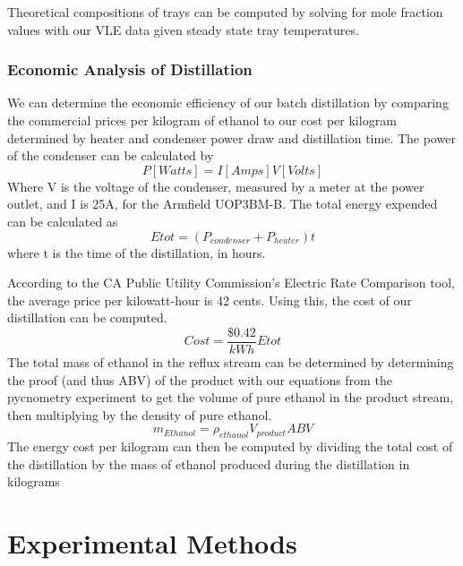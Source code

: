 \documentclass[lettersize,journal]{IEEEtran}
\begin{document}
	Theoretical compositions of trays can be computed by solving for mole fraction values with our VLE data given steady state tray temperatures.
	\subsubsection{Economic Analysis of Distillation}
	We can determine the economic efficiency of our batch distillation by comparing the commercial prices per kilogram of ethanol to our cost per kilogram determined by heater and condenser power draw and distillation time.
	The power of the condenser can be calculated by
	\begin{equation}
		\label{deqn_ex5.5}
		P [Watts] = I[Amps]V[Volts]
	\end{equation}
	Where V is the voltage of the condenser, measured by a meter at the power outlet, and I is 25A, for the Armfield UOP3BM-B.
	The total energy expended can be calculated as
	\begin{equation}
		\label{deqn_ex5.5}
		E {tot} = (P_{condenser} + P_{heater})t
	\end{equation}
	where t is the time of the distillation, in hours.
	
	According to the CA Public Utility Commission's Electric Rate Comparison tool, the average price per kilowatt-hour is 42 cents. Using this, the cost of our distillation can be computed.
	\begin{equation}
		\label{deqn_ex5.5}
		Cost= \frac{\$0.42}{kWh}E {tot} 
	\end{equation}
	The total mass of ethanol in the reflux stream can be determined by determining the proof (and thus ABV) of the product with our equations from the pycnometry experiment to get the volume of pure ethanol in the product stream, then multiplying by the density of pure ethanol.
	\begin{equation}
		\label{deqn_ex5.5}
		m_{Ethanol}= \rho_{ethanol}V_{product}ABV
	\end{equation}
	The energy cost per kilogram can then be computed by dividing the total cost of the distillation by the mass of ethanol produced during the distillation in kilograms
	
	\section{Experimental Methods}
\end{document}
